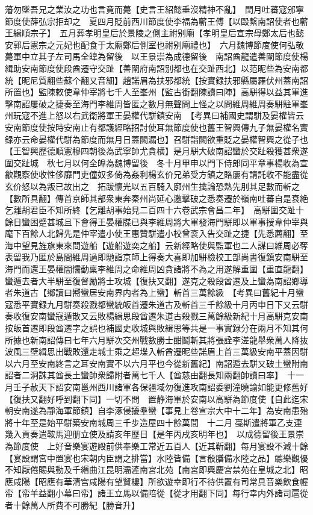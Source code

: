 藩勿墜吾兄之業汝之功也言竟而薨【史言王紹懿垂沒精神不亂】　閏月吐蕃寇邠寧節度使薛弘宗拒却之　夏四月貶前西川節度使李福為蘄王傅【以毆繫南詔使者也蘄王緝順宗子】　五月葬孝明皇后於景陵之側主祔别廟【孝明皇后宣宗母鄭太后也懿安郭后憲宗之元妃也配食于太廟鄭后側室也祔别廟禮也】　六月魏博節度使何弘敬薨軍中立其子左司馬全皥為留後　以王景崇為成德留後　南詔酋龍遣善闡節度使楊緝助安南節度使段酋遷守交趾【善闡府南詔别都也在交趾西北】以范昵些為安南都統【昵尼質翻些蘇个翻又音細】趙諾眉為扶邪都統【按實録扶邪縣屬羅伏州蓋南詔所置也】監陳敕使韋仲宰將七千人至峯州【監古銜翻陳讀曰陣】高駢得以益其軍進擊南詔屢破之捷奏至海門李維周皆匿之數月無聲問上怪之以問維周維周奏駢駐軍峯州玩寇不進上怒以右武衛將軍王晏權代駢鎮安南　【考異曰補國史謂駢及晏權皆云安南節度使按時安南止有都護經略招討使耳無節度使也舊王智興傳九子無晏權名實録亦云命晏權代駢為節度而無月日蓋闕漏也】召駢詣闕欲重貶之晏權智興之從子也【王智興歷德順憲穆四朝後為武寧帥尤貪横】是月駢大破南詔蠻於交趾殺獲甚衆遂圍交趾城　秋七月以何全皥為魏博留後　冬十月甲申以門下侍郎同平章事楊收為宣歙觀察使收性侈靡門吏僮奴多倚為姦利楊玄价兄弟受方鎮之賂屢有請託收不能盡從玄价怒以為叛已故出之　拓跋懷光以五百騎入廓州生擒論恐熱先刖其足數而斬之【數所具翻】傳首京師其部衆東奔秦州尚延心邀擊破之悉奏遷於嶺南吐蕃自是衰絶乞離胡君臣不知所終【乞離胡事始見二百四十六卷武宗會昌二年】　高駢圍交趾十餘日蠻困蹙甚城且下會得王晏權牒已與李維周將大軍發海門駢即以軍事授韋仲宰與麾下百餘人北歸先是仲宰遣小使王惠贊駢遣小校曾衮入告交趾之捷【先悉薦翻】至海中望見旌旗東來問遊船【遊船遊奕之船】云新經略使與監軍也二人謀曰維周必奪表留我乃匿於島間維周過即馳詣京師上得奏大喜即加駢檢校工部尚書復鎮安南駢至海門而還王晏權闇懦動稟李維周之命維周凶貪諸將不為之用遂解重圍【重直龍翻】蠻遁去者大半駢至復督勵將士攻城【復扶又翻】遂克之殺段酋遷及上蠻為南詔鄉導者朱道古【鄉讀曰嚮蠻居安南界内者為上蠻】斬首三萬餘級　【考異曰舊紀十月蠻寇悉平實録九月駢奏殺戮都蠻統皈首遷朱道古及斬首三千餘級十月丙申日下又云駢奏收復安南蠻寇遁散又云敗楊緝思段酋遷朱道古殺戮三萬餘級新紀十月高駢克安南按皈首遷即段酋遷字之誤也補國史收城與敗緝思等共是一事實録分在兩月不知其何所據也新南詔傳曰七年六月駢次交州戰數勝士酣鬭斬其將張詮李溠龍舉衆萬人降抜波風三壁緝思出戰敗還走城士乘之超堞入斬酋遷昵些諾眉上首三萬級安南平蓋因駢以六月至安南終言之耳安南實不以六月平也今從新舊紀】南詔遁去駢又破土蠻附南詔者二洞誅其酋長土蠻帥衆歸附者萬七千人【酋慈由翻長知兩翻帥讀曰率】　十一月壬子赦天下詔安南邕州西川諸軍各保疆域勿復進攻南詔委劉潼曉諭如能更修舊好【復扶又翻好呼到翻下同】一切不問　置静海軍於安南以高駢為節度使【自此迄宋朝安南遂為靜海軍節鎮】自李涿侵擾羣蠻【事見上卷宣宗大中十二年】為安南患殆將十年至是始平駢築安南城周三千步造屋四十餘萬間　十二月戞斯遣將軍乙支連幾入貢奏遣鞍馬迎册立使及請亥年歷日【是年丙戌亥明年也】　以成德留後王景崇為節度使　上好音樂宴遊殿前供奉樂工常近五百人【近其靳翻】每月宴設不減十餘【宴設謂宮中置宴也宋朝内臣謂之排當】水陸皆備【言殽膳備水陸之品】聼樂觀優不知厭倦賜與動及千緡曲江昆明灞滻南宮北苑【南宮即興慶宮禁苑在皇城之北】昭應咸陽【昭應有華清宫咸陽有望賢樓】所欲遊幸即行不待供置有司常具音樂飲食幄帟【帟羊益翻小幕曰帟】諸王立馬以備陪從【從才用翻下同】每行幸内外諸司扈從者十餘萬人所費不可勝紀【勝音升】

